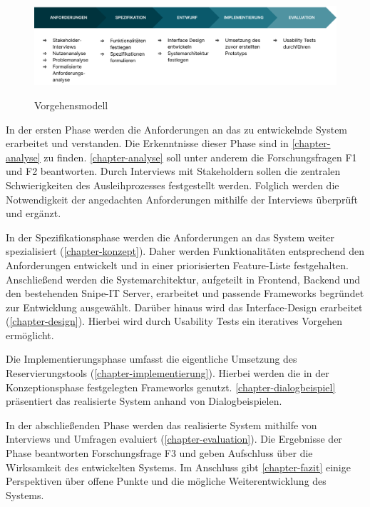 \begin{figure}[h]
  \centering
  \includegraphics[scale=0.156]{Bilder/Screenshot 2022-10-17 at 18-39-40 Vorgehensmodell.pptx.png}
  \label{fig:schablone}
  \caption[Vorgehensmodell]{Vorgehensmodell}
\end{figure}

In der ersten Phase werden die Anforderungen an das zu entwickelnde System erarbeitet und
verstanden. Die Erkenntnisse dieser Phase sind in \ref{chapter-analyse} zu finden. 
\ref{chapter-analyse} soll unter anderem die Forschungsfragen F1 und F2 beantworten. Durch
Interviews mit Stakeholdern sollen die zentralen Schwierigkeiten des Ausleihprozesses
festgestellt werden. Folglich werden die Notwendigkeit der angedachten Anforderungen mithilfe der
Interviews überprüft und ergänzt.

In der Spezifikationsphase werden die Anforderungen an das System weiter spezialisiert
(\ref{chapter-konzept}). Daher werden Funktionalitäten entsprechend den Anforderungen entwickelt und
in einer priorisierten Feature-Liste festgehalten. Anschließend werden die Systemarchitektur,
aufgeteilt in Frontend, Backend und den bestehenden Snipe-IT Server, erarbeitet und passende
Frameworks begründet zur Entwicklung ausgewählt. Darüber hinaus wird das Interface-Design
erarbeitet (\ref{chapter-design}). Hierbei wird durch Usability Tests ein iteratives Vorgehen
ermöglicht.

Die Implementierungsphase umfasst die eigentliche Umsetzung des Reservierungstools
(\ref{chapter-implementierung}). Hierbei werden die in der Konzeptionsphase festgelegten Frameworks
genutzt. \ref{chapter-dialogbeispiel} präsentiert das realisierte System anhand von
Dialogbeispielen.

In der abschließenden Phase werden das realisierte System mithilfe von Interviews und Umfragen
evaluiert (\ref{chapter-evaluation}). Die Ergebnisse der Phase beantworten Forschungsfrage F3 und
geben Aufschluss über die Wirksamkeit des entwickelten Systems. Im Anschluss gibt
\ref{chapter-fazit} einige Perspektiven über offene Punkte und die mögliche Weiterentwicklung des
Systems.